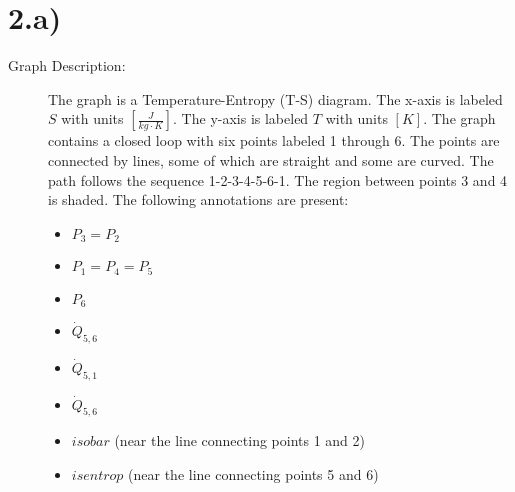 \section*{2.a)}

\begin{description}
    \item[Graph Description:] The graph is a Temperature-Entropy (T-S) diagram. The x-axis is labeled \( S \) with units \([ \frac{J}{kg \cdot K} ]\). The y-axis is labeled \( T \) with units \([ K ]\). The graph contains a closed loop with six points labeled 1 through 6. The points are connected by lines, some of which are straight and some are curved. The path follows the sequence 1-2-3-4-5-6-1. The region between points 3 and 4 is shaded. The following annotations are present:
    \begin{itemize}
        \item \( P_3 = P_2 \)
        \item \( P_1 = P_4 = P_5 \)
        \item \( P_6 \)
        \item \( \dot{Q}_{5,6} \)
        \item \( \dot{Q}_{5,1} \)
        \item \( \dot{Q}_{5,6} \)
        \item \( isobar \) (near the line connecting points 1 and 2)
        \item \( isentrop \) (near the line connecting points 5 and 6)
    \end{itemize}
\end{description}